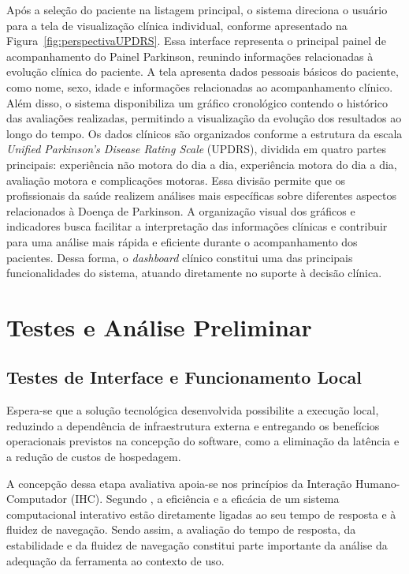 Após a seleção do paciente na listagem principal, o sistema direciona o usuário para a tela de visualização clínica individual, conforme apresentado na Figura~\ref{fig:perspectivaUPDRS}. Essa interface representa o principal painel de acompanhamento do Painel Parkinson, reunindo informações relacionadas à evolução clínica do paciente.
A tela apresenta dados pessoais básicos do paciente, como nome, sexo, idade e informações relacionadas ao acompanhamento clínico. Além disso, o sistema disponibiliza um gráfico cronológico contendo o histórico das avaliações realizadas, permitindo a visualização da evolução dos resultados ao longo do tempo.
Os dados clínicos são organizados conforme a estrutura da escala \textit{Unified Parkinson’s Disease Rating Scale} (UPDRS), dividida em quatro partes principais: experiência não motora do dia a dia, experiência motora do dia a dia, avaliação motora e complicações motoras. Essa divisão permite que os profissionais da saúde realizem análises mais específicas sobre diferentes aspectos relacionados à Doença de Parkinson.
A organização visual dos gráficos e indicadores busca facilitar a interpretação das informações clínicas e contribuir para uma análise mais rápida e eficiente durante o acompanhamento dos pacientes. Dessa forma, o \textit{dashboard} clínico constitui uma das principais funcionalidades do sistema, atuando diretamente no suporte à decisão clínica.


\section{Testes e Análise Preliminar}
\label{sec:TestesAnalisepreliminar}

\subsection{Testes de Interface e Funcionamento Local}

Espera-se que a solução tecnológica desenvolvida possibilite a execução local, reduzindo a dependência de infraestrutura externa e entregando os benefícios operacionais previstos na concepção do software, como a eliminação da latência e a redução de custos de hospedagem.

A concepção dessa etapa avaliativa apoia-se nos princípios da Interação Humano-Computador (IHC). Segundo \cite{ihc2022}, a eficiência e a eficácia de um sistema computacional interativo estão diretamente ligadas ao seu tempo de resposta e à fluidez de navegação. Sendo assim, a avaliação do tempo de resposta, da estabilidade e da fluidez de navegação constitui parte importante da análise da adequação da ferramenta ao contexto de uso.

